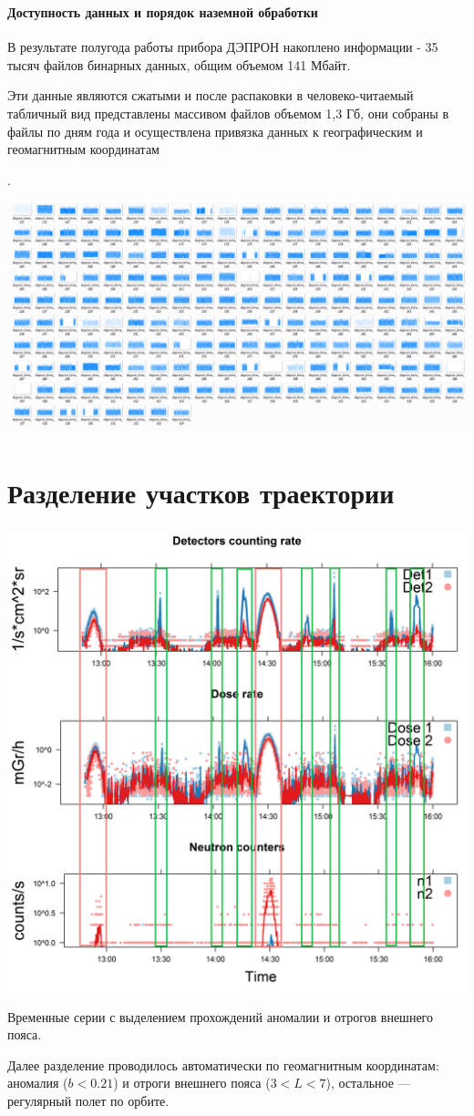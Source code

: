 \documentclass[t, aspectratio=43]{beamer}
\begin{document}
\begin{frame}	
\frametitle{\insertsection} 
\framesubtitle{Доступность данных и порядок наземной обработки}
{\tiny В результате полугода работы прибора ДЭПРОН накоплено информации - 35 тысяч файлов бинарных данных, общим объемом 141 Мбайт.

 Эти данные являются сжатыми и после распаковки в человеко-читаемый табличный вид представлены массивом файлов объемом 1,3 Гб, они собраны в файлы по дням года и осуществлена привязка данных к географическим и геомагнитным координатам}.
\begin{center}
	\includegraphics[width=1\linewidth]{images/timegraph}
\end{center}
\end{frame}

\section{Разделение участков траектории}\label{header-n0}
\begin{frame}	

\frametitle{\insertsection} 

\centering
\includegraphics[width=0.55\linewidth]{images/depronseclognew41}

{\tiny 
Временные серии с выделением прохождений аномалии и отрогов внешнего пояса.

 Далее разделение проводилось автоматически по геомагнитным координатам:\\  аномалия ($ b < 0.21 $) и отроги внешнего пояса ($ 3 < L < 7 $), остальное --- регулярный полет по орбите.}
\end{frame}
\end{document}
